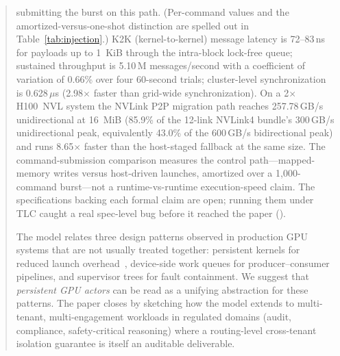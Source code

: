 \begin{abstract}
submitting the burst on this path.  (Per-command values and the
amortized-versus-one-shot distinction are spelled out in
Table~\ref{tab:injection}.)  K2K (kernel-to-kernel)
message latency is 72--83\,ns for payloads up to 1~KiB through the
intra-block lock-free queue; sustained throughput is 5.10\,M
messages/second with a coefficient of variation of 0.66\% over
four 60-second trials; cluster-level synchronization is
0.628\,\(\mu\)s (2.98\(\times\) faster than grid-wide
synchronization).  On a 2\(\times\) H100~NVL system the NVLink
P2P migration path reaches 257.78\,GB/s unidirectional at 16~MiB
(85.9\% of the 12-link NVLink4 bundle's 300\,GB/s unidirectional
peak, equivalently 43.0\% of the 600\,GB/s bidirectional peak)
and runs 8.65\(\times\) faster than the host-staged fallback at
the same size.  The command-submission
comparison measures the control path---mapped-memory writes
versus host-driven launches, amortized over a 1{,}000-command
burst---not a runtime-vs-runtime execution-speed claim.  The
\TLA{} specifications backing each formal claim are open; running
them under TLC caught a real spec-level bug before it reached the
paper ().

The model relates three design patterns observed in production
GPU systems that are not usually treated together: persistent
kernels for reduced launch overhead~\citep{gupta2012persistent,%
aila2009raytrace}, device-side work queues for
producer--consumer pipelines, and supervisor trees for fault
containment.  We suggest that \emph{persistent GPU actors} can be
read as a unifying abstraction for these patterns.  The paper
closes by sketching how the model extends to multi-tenant,
multi-engagement workloads in regulated domains (audit,
compliance, safety-critical reasoning) where a routing-level
cross-tenant isolation guarantee is itself an auditable
deliverable.
\end{abstract}
